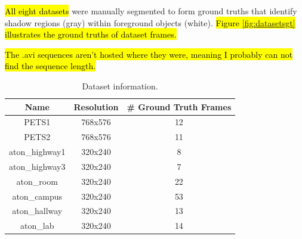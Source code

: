 \documentclass[12pt]{report}
\begin{document}
\hl{All eight datasets} were manually segmented to form ground truths that identify shadow regions (gray) within foreground objects (white). \hl{Figure \ref{fig:datasetsgt} illustrates the ground truths of dataset frames.}

\hl{The .avi sequences aren't hosted where they were, meaning I probably can not find the sequence length.}

\begin{table}
\centering
\begin{tabular}{ |c|c|c| }
	\hline
	\textbf{Name} & \textbf{Resolution} & \textbf{\# Ground Truth Frames} \\
	\hline
	\hline
	PETS1 & 768x576 & 12 \\
	\hline
	PETS2 & 768x576 & 11 \\
	\hline
	aton\_highway1 & 320x240 & 8 \\
	\hline 
	aton\_highway3 & 320x240 & 7 \\ 
	\hline
	aton\_room & 320x240 & 22 \\ 
	\hline
	aton\_campus & 320x240 & 53 \\ 
	\hline
	aton\_hallway & 320x240 & 13 \\
	\hline
	aton\_lab & 320x240 & 14 \\ 
	\hline
\end{tabular} \label{table:datasets}
\caption{Dataset information.}
\end{table}
\end{document}
